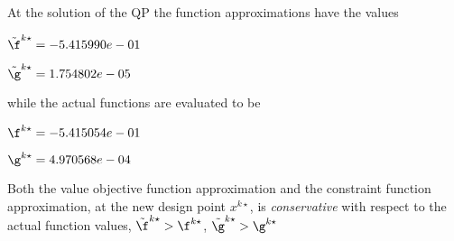 At the solution of the QP the function approximations have the values

$\tilde \f^{k\star} = -5.415990e-01$

$\tilde \g^{k\star} =  1.754802e-05$

\bigskip
while the actual functions are evaluated to be

$\f^{k\star} = -5.415054e-01$

$\g^{k\star} =  4.970568e-04$

\bigskip 
 Both the value objective function approximation                     and the constraint function approximation, at the new design point                     $x^{k\star}$, is \emph{conservative} with respect to the actual function                     values, $\tilde {\f}^{k\star} > {\f}^{k\star}$,                     $\tilde {\g}^{k\star} > {\g}^{k\star}$ 

